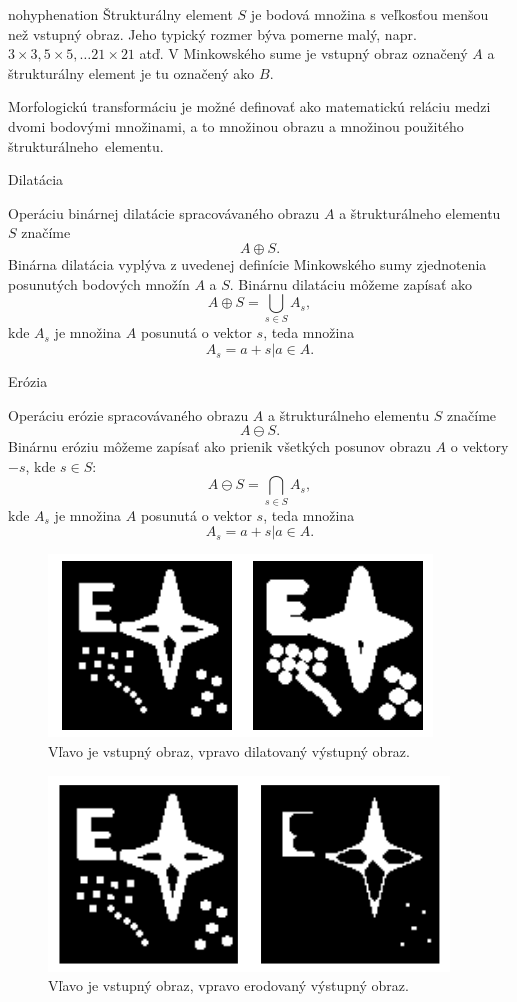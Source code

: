 \begin{hyphenrules}{nohyphenation}
Štrukturálny element $S$ je bodová množina s veľkosťou menšou než vstupný obraz. Jeho typický rozmer býva pomerne malý, napr. $3\times3, 5\times5,\dots21\times21$ atď. V Minkowského sume je vstupný obraz označený $A$ a štrukturálny element je tu označený ako $B$.
\newline

Morfologickú transformáciu je možné definovať ako matematickú reláciu medzi dvomi bodovými množinami, a to množinou obrazu a množinou použitého štrukturálneho~elementu.
\begin{defn}{Dilatácia}

    Operáciu binárnej dilatácie spracovávaného obrazu $A$ a štrukturálneho elementu $S$ značíme
    \[A\oplus S.\]
    Binárna dilatácia vyplýva z uvedenej definície Minkowského sumy zjednotenia posunutých bodových množín $A$ a $S$. Binárnu dilatáciu môžeme zapísať ako
    \[A \oplus S = \bigcup_{s \in S} A_s,\]
    kde $A_s$ je množina $A$ posunutá o vektor $s$, teda množina
    \[A_s = a + s | a\in A.\]
\end{defn}

\begin{defn}{Erózia}

    Operáciu erózie spracovávaného obrazu $A$ a štrukturálneho elementu $S$ značíme
    \[A\ominus S.\]
    Binárnu eróziu môžeme zapísať ako prienik všetkých posunov obrazu $A$ o vektory $-s$, kde $s \in S$:
    \[A \ominus S = \bigcap_{s \in S} A_s,\]
    kde $A_s$ je množina $A$ posunutá o vektor $s$, teda množina
    \[A_s = a + s | a\in A.\]
\end{defn}

\begin{figure}[H]
    \centering
    \includegraphics[width=0.5\linewidth]{img/dilatacia.png}
    \caption{Vľavo je vstupný obraz, vpravo dilatovaný výstupný obraz.}
    \label{fig:dilate}
\end{figure}
\begin{figure}[H]
    \centering
    \includegraphics[width=0.5\linewidth]{img/erozia.png}
    \caption{Vľavo je vstupný obraz, vpravo erodovaný výstupný obraz.}
    \label{fig:erode}
\end{figure}

\end{hyphenrules}
